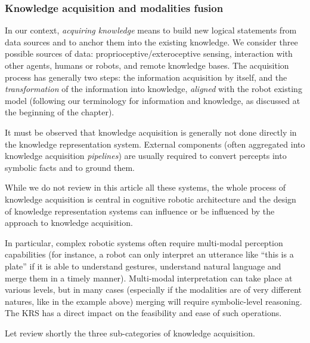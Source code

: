 \subsubsection{Knowledge acquisition and modalities fusion}
\label{sect|knowledge-acquisition}

In our context, \emph{acquiring knowledge} means to build new logical
statements from data sources and to anchor them into the existing knowledge. We
consider three possible sources of data: proprioceptive/exteroceptive sensing,
interaction with other agents, humans or robots, and remote knowledge bases.
The acquisition process has generally two steps: the information acquisition by
itself, and the \emph{transformation} of the information into knowledge,
\emph{aligned} with the robot existing model (following our terminology for
information and knowledge, as discussed at the beginning of the chapter).

It must be observed that knowledge acquisition is generally not done directly
in the knowledge representation system. External components (often aggregated
into knowledge acquisition \emph{pipelines}) are usually required to convert
percepts into symbolic facts and to ground them.

While we do not review in this article all these systems, the whole process of
knowledge acquisition is central in cognitive robotic architecture and the
design of knowledge representation systems can influence or be influenced by
the approach to knowledge acquisition.

In particular, complex robotic systems often require multi-modal perception
capabilities (for instance, a robot can only interpret an utterance like ``this
is a plate'' if it is able to understand gestures, understand natural language
and merge them in a timely manner). Multi-modal interpretation can take place
at various levels, but in many cases (especially if the modalities are of very
different natures, like in the example above) merging will require
symbolic-level reasoning. The KRS has a direct impact on the feasibility and
ease of such operations.

Let review shortly the three sub-categories of knowledge acquisition.

\begin{scriptsize}
\begin{center}
\end{center}
\end{scriptsize}

